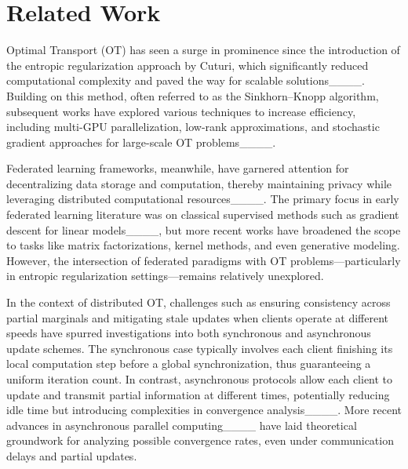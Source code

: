 \section{Related Work}
Optimal Transport (OT) has seen a surge in prominence since the introduction of the entropic regularization approach by Cuturi, which significantly reduced computational complexity and paved the way for scalable solutions____. Building on this method, often referred to as the Sinkhorn–Knopp algorithm, subsequent works have explored various techniques to increase efficiency, including multi-GPU parallelization, low-rank approximations, and stochastic gradient approaches for large-scale OT problems____. %

Federated learning frameworks, meanwhile, have garnered attention for decentralizing data storage and computation, thereby maintaining privacy while leveraging distributed computational resources____. The primary focus in early federated learning literature was on classical supervised methods such as gradient descent for linear models____, but more recent works have broadened the scope to tasks like matrix factorizations, kernel methods, and even generative modeling. However, the intersection of federated paradigms with OT problems—particularly in entropic regularization settings—remains relatively unexplored.

In the context of distributed OT, challenges such as ensuring consistency across partial marginals and mitigating stale updates when clients operate at different speeds have spurred investigations into both synchronous and asynchronous update schemes. The synchronous case typically involves each client finishing its local computation step before a global synchronization, thus guaranteeing a uniform iteration count. In contrast, asynchronous protocols allow each client to update and transmit partial information at different times, potentially reducing idle time but introducing complexities in convergence analysis____. More recent advances in asynchronous parallel computing____ have laid theoretical groundwork for analyzing possible convergence rates, even under communication delays and partial updates.

